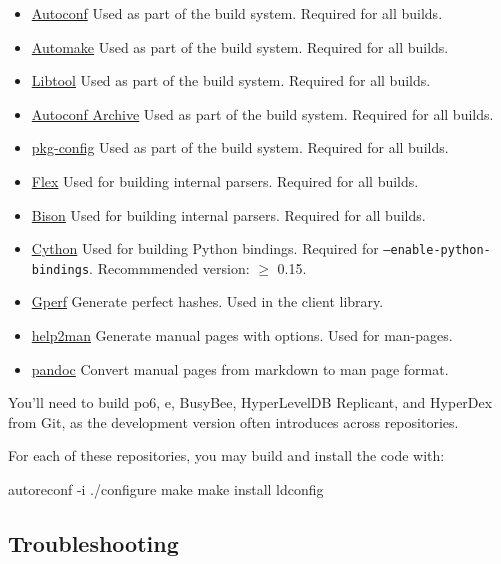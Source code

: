 \begin{itemize}
\item \href{http://www.gnu.org/software/autoconf/}{Autoconf} Used as part of
    the build system.  Required for all builds.
\item \href{http://www.gnu.org/software/automake/}{Automake} Used as part of
    the build system.  Required for all builds.
\item \href{http://www.gnu.org/software/libtool/}{Libtool} Used as part of the
    build system.  Required for all builds.
\item \href{http://www.gnu.org/software/autoconf-archive/}{Autoconf Archive}
    Used as part of the build system.  Required for all builds.
\item \href{http://www.freedesktop.org/wiki/Software/pkg-config/}{pkg-config}
    Used as part of the build system.  Required for all builds.
\item \href{http://flex.sourceforge.net/}{Flex} Used for building internal
    parsers.  Required for all builds.
\item \href{http://www.gnu.org/software/bison/}{Bison} Used for building
    internal parsers.  Required for all builds.
\item \href{http://cython.org/}{Cython} Used for building Python bindings.
    Required for \texttt{--enable-python-bindings}.
    Recommmended version: $\ge$ 0.15.
\item \href{http://www.gnu.org/software/gperf/}{Gperf}  Generate perfect
    hashes.  Used in the client library.
\item \href{http://www.gnu.org/software/help2man/}{help2man}  Generate manual
    pages with options.  Used for man-pages.
\item \href{http://johnmacfarlane.net/pandoc/}{pandoc}  Convert manual pages
    from markdown to man page format.
\end{itemize}

You'll need to build po6, e, BusyBee, HyperLevelDB Replicant, and HyperDex from
Git, as the development version often introduces across repositories.

For each of these repositories, you may build and install the code with:

\begin{consolecode}
autoreconf -i
./configure
make
make install
ldconfig
\end{consolecode}

\subsection{Troubleshooting}
\label{sec:installation:troubleshooting}


